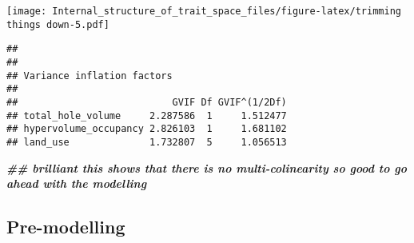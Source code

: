 \documentclass[
]{article}
\newenvironment{Shaded}{\begin{snugshade}}{\end{snugshade}}
\newcommand{\DecValTok}[1]{\textcolor[rgb]{0.00,0.00,0.81}{#1}}
\newcommand{\DocumentationTok}[1]{\textcolor[rgb]{0.56,0.35,0.01}{\textbf{\textit{#1}}}}
\newcommand{\FunctionTok}[1]{\textcolor[rgb]{0.00,0.00,0.00}{#1}}
\newcommand{\NormalTok}[1]{#1}
\newcommand{\OtherTok}[1]{\textcolor[rgb]{0.56,0.35,0.01}{#1}}
\newcommand{\SpecialCharTok}[1]{\textcolor[rgb]{0.00,0.00,0.00}{#1}}
\newcommand{\StringTok}[1]{\textcolor[rgb]{0.31,0.60,0.02}{#1}}
\begin{document}
\begin{Shaded}
\end{Shaded}

\texttt{[image: Internal\_structure\_of\_trait\_space\_files/figure-latex/trimming things down-5.pdf]}

\begin{Shaded}
\end{Shaded}

\begin{verbatim}
## 
## 
## Variance inflation factors
## 
##                           GVIF Df GVIF^(1/2Df)
## total_hole_volume     2.287586  1     1.512477
## hypervolume_occupancy 2.826103  1     1.681102
## land_use              1.732807  5     1.056513
\end{verbatim}

\begin{Shaded}
\begin{Highlighting}[]
\DocumentationTok{\#\# brilliant this shows that there is no multi{-}colinearity so good to go ahead with the modelling}
\end{Highlighting}
\end{Shaded}

\hypertarget{pre-modelling}{%
\subsection{Pre-modelling}\label{pre-modelling}}
\end{document}
